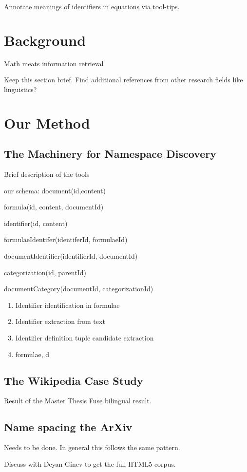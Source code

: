\documentclass{sig-alternate-2013}
\begin{document}
Annotate meanings of identifiers in equations via tool-tips.



\section{Background}
Math meats information retrieval

Keep this section brief. Find additional references from other research fields like linguistics?

\section{Our Method}
\subsection{The Machinery for Namespace Discovery}
Brief description of the tools

our schema:
document(id,content)


formula(id, content, documentId)

identifier(id, content)

formulaeIdentifer(identiferId, formulaeId)

documentIdentifier(identifierId, documentId)

categorization(id, parentId)

documentCategory(documentId, categorizationId)

\begin{enumerate}
	\item Identifier identification in formulae
	\item Identifier extraction from text
	\item Identifier definition tuple candidate extraction
	\item formulae, d
\end{enumerate}
\subsection{The Wikipedia Case Study}
Result of the Master Thesis
Fuse bilingual result.
\subsection{Name spacing the ArXiv}
Needs to be done. In general this follows the same pattern.

Discuss with Deyan Ginev to get the full HTML5 corpus.
\end{document}
